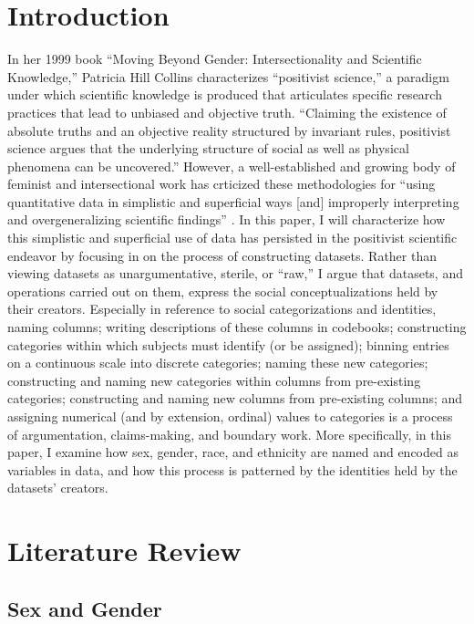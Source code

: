 \section{Introduction} \label{sec:bound-work}

\hspace{13pt} In her 1999 book ``Moving Beyond Gender: Intersectionality and Scientific Knowledge,'' Patricia Hill Collins characterizes ``positivist science,'' a paradigm under which scientific knowledge is produced that articulates specific research practices that lead to unbiased and objective truth. ``Claiming the existence of absolute truths and an objective reality structured by invariant rules, positivist science argues that the underlying structure of social as well as physical phenomena can be uncovered.'' However, a well-established and growing body of feminist and intersectional work has crticized these methodologies for ``using quantitative data in simplistic and superficial ways [and] improperly interpreting and overgeneralizing scientific findings'' \cite{collins1999moving}. In this paper, I will characterize how this simplistic and superficial use of data has persisted in the positivist scientific endeavor by focusing in on the process of constructing datasets. Rather than viewing datasets as unargumentative, sterile, or ``raw,'' I argue that datasets, and operations carried out on them, express the social conceptualizations held by their creators. Especially in reference to social categorizations and identities, naming columns; writing descriptions of these columns in codebooks; constructing categories within which subjects must identify (or be assigned); binning entries on a continuous scale into discrete categories; naming these new categories; constructing and naming new categories within columns from pre-existing categories; constructing and naming new columns from pre-existing columns; and assigning numerical (and by extension, ordinal) values to categories is a process of argumentation, claims-making, and boundary work. More specifically, in this paper, I examine how sex, gender, race, and ethnicity are named and encoded as variables in data, and how this process is patterned by the identities held by the datasets' creators.

\section{Literature Review} \label{sec:lit-review}

\subsection{Sex and Gender} \label{sec:sex-gender}

